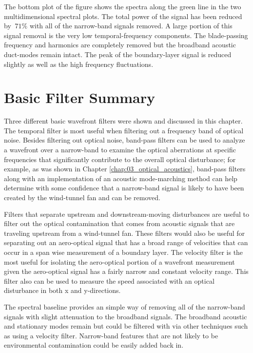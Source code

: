 The bottom plot of the figure shows the spectra along the green line in the two multidimensional spectral plots.
The total power of the signal has been reduced by $~71\%$ with all of the narrow-band signals removed.
A large portion of this signal removal is the very low temporal-frequency components.
The blade-passing frequency and harmonics are completely removed but the broadband acoustic duct-modes remain intact.
The peak of the boundary-layer signal is reduced slightly as well as the high frequency fluctuations.

\section{Basic Filter Summary}
Three different basic wavefront filters were shown and discussed in this chapter.
The temporal filter is most useful when filtering out a frequency band of optical noise.
Besides filtering out optical noise, band-pass filters can be used to analyze a wavefront over a narrow-band to examine the optical aberrations at specific frequencies that significantly contribute to the overall optical disturbance; for example, as was shown in Chapter \ref{chap:03_optical_acoustics}, band-pass filters along with an implementation of an acoustic mode-marching method can help determine with some confidence that a narrow-band signal is likely to have been created by the wind-tunnel fan and can be removed.

Filters that separate upstream and downstream-moving disturbances are useful to filter out the optical contamination that comes from acoustic signals that are traveling upstream from a wind-tunnel fan.
These filters would also be useful for separating out an aero-optical signal that has a broad range of velocities that can occur in a span wise measurement of a boundary layer.
The velocity filter is the most useful for isolating the aero-optical portion of a wavefront measurement given the aero-optical signal has a fairly narrow and constant velocity range.
This filter also can be used to measure the speed associated with an optical disturbance in both x and y-directions.

The spectral baseline provides an simple way of removing all of the narrow-band signals with slight attenuation to the broadband signals.
The broadband acoustic and stationary modes remain but could be filtered with via other techniques such as using a velocity filter.
Narrow-band features that are not likely to be environmental contamination could be easily added back in.
